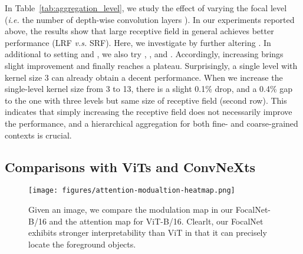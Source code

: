 \documentclass{article}
\begin{document}
In Table~\ref{tab:aggregation_level}, we study the effect of varying the focal level (\emph{i.e.} the number of depth-wise convolution layers ). In our experiments reported above, the results show that large receptive field in general achieves better performance (LRF \textit{v.s.} SRF). Here, we investigate by further altering . In additional to setting  and , we also try , , and . Accordingly, increasing  brings slight improvement and finally reaches a plateau. Surprisingly, a single level with kernel size 3 can already obtain a decent performance. When we increase the single-level kernel size from 3 to 13, there is a slight 0.1\% drop, and a 0.4\% gap to the one with three levels but same size of receptive field (second row). This indicates that simply increasing the receptive field does not necessarily improve the performance, and a hierarchical aggregation for both fine- and coarse-grained contexts is crucial. 


\subsection{Comparisons with ViTs and ConvNeXts}

\begin{figure}
    \centering
    \texttt{[image: figures/attention-modualtion-heatmap.png]}
    \caption{Given an image, we compare the modulation map in our FocalNet-B/16 and the attention map for ViT-B/16. Clearlt, our FocalNet exhibits stronger interpretability than ViT in that it can precisely locate the foreground objects.}
    \label{fig:modulation_attention_maps}
\end{figure}
\end{document}
